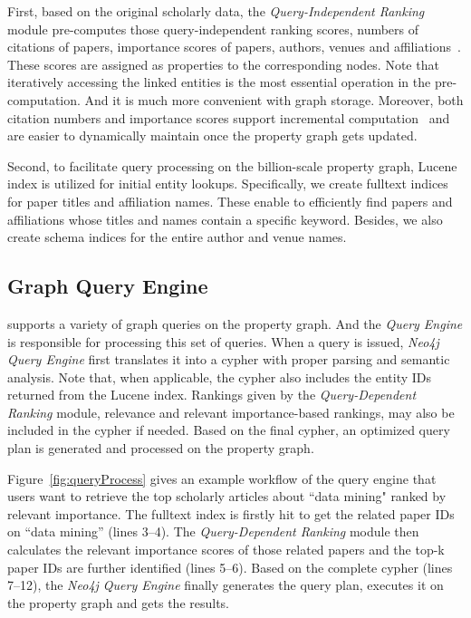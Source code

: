 First, based on the original scholarly data, the {\em Query-Independent Ranking} module pre-computes those query-independent ranking scores, \ie numbers of citations of papers, importance scores of papers, authors, venues and affiliations~\cite{ma2018query}. These scores are assigned as properties to the corresponding nodes.
Note that iteratively accessing the linked entities is the most essential operation in the pre-computation. And it is much more convenient with graph storage.
Moreover, both citation numbers and importance scores support incremental computation~\cite{ma2018query} and are easier to dynamically maintain once the property graph gets updated.


Second, to facilitate query processing on the billion-scale property graph, Lucene index is utilized for initial entity lookups. Specifically, we create fulltext indices for paper titles and affiliation names. These enable to efficiently find papers and affiliations whose titles and names contain a specific keyword. Besides, we also create schema indices for the entire author and venue names. %




\subsection{Graph Query Engine} \label{subsec:qe}
\oursystem supports a variety of graph queries on the property graph. And the {\em Query Engine} is responsible for processing this set of queries. When a query is issued, {\em Neo4j Query Engine} first translates it into a cypher with proper parsing and semantic analysis.
Note that, when applicable, the cypher also includes the entity IDs returned from the Lucene index. Rankings given by the {\em Query-Dependent Ranking} module, \ie relevance and relevant importance-based rankings, may also be included in the cypher if needed. Based on the final cypher, an optimized query plan is generated and processed on the property graph.


Figure~\ref{fig:queryProcess} gives an example workflow of the query engine that users want to retrieve the top scholarly articles about ``data mining"  ranked by relevant importance. The fulltext index is firstly hit to get the related paper IDs on ``data mining'' (lines 3--4). The {\em Query-Dependent Ranking} module then calculates the relevant importance scores of those related papers and the top-k paper IDs are further identified (lines 5--6). Based on the complete cypher (lines 7--12), the {\em Neo4j Query Engine} finally generates the query plan, executes it on the property graph and gets the results.

